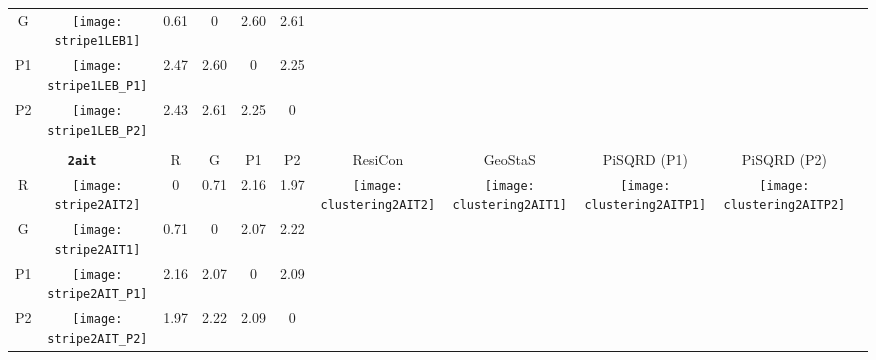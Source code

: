 \documentclass[a4paper,11pt,twoside]{book}%
\begin{document}
\begin{appendices}
\begin{sidewaystable}[h!]
\begin{tabular*}{4cm}{cc|c|c|c|c|c|c|c|c|c|}
\cline{1-6}
\multicolumn{1}{|c|}{G} & \texttt{[image: stripe1LEB1]} & 0.61 & 0 & 2.60 & 2.61 & \multirow{4}{*}{} & \multirow{4}{*}{} & \multirow{4}{*}{} & \multirow{4}{*}{} & \multirow{5}{*}{} \\
\cline{1-6}
\multicolumn{1}{|c|}{P1} & \texttt{[image: stripe1LEB\_P1]} & 2.47 & 2.60 & 0 & 2.25 & \multirow{4}{*}{} & \multirow{4}{*}{} & \multirow{4}{*}{} & \multirow{4}{*}{} & \multirow{5}{*}{}  \\
\cline{1-6}
\multicolumn{1}{|c|}{P2} & \texttt{[image: stripe1LEB\_P2]} & 2.43 & 2.61 & 2.25 & 0 & \multirow{4}{*}{} & \multirow{4}{*}{} & \multirow{4}{*}{} & \multirow{4}{*}{} & \multirow{5}{*}{}  \\
\cline{1-11}
\\
\multicolumn{2}{|c|}{{\bf \texttt{2ait}}} & R & G & P1 & P2 & ResiCon & GeoStaS & PiSQRD (P1) & PiSQRD (P2) & \multirow{5}{*}{\vspace{-0.15cm}\texttt{[image: threeHistogram2AIT]}}  \\
\cline{1-10}
\multicolumn{1}{|c|}{R} & \texttt{[image: stripe2AIT2]} & 0 & 0.71 & 2.16 & 1.97 & \multirow{4}{*}{\vspace{-0.3cm}\texttt{[image: clustering2AIT2]}} & \multirow{4}{*}{\vspace{-0.3cm}\texttt{[image: clustering2AIT1]}} & \multirow{4}{*}{\vspace{-0.3cm}\texttt{[image: clustering2AITP1]}} & \multirow{4}{*}{\vspace{-0.3cm}\texttt{[image: clustering2AITP2]}} &  \multirow{5}{*}{} \\
\cline{1-6}
\multicolumn{1}{|c|}{G} & \texttt{[image: stripe2AIT1]} & 0.71 & 0 & 2.07 & 2.22 & \multirow{4}{*}{} & \multirow{4}{*}{} & \multirow{4}{*}{} & \multirow{4}{*}{} & \multirow{5}{*}{} \\
\cline{1-6}
\multicolumn{1}{|c|}{P1} & \texttt{[image: stripe2AIT\_P1]} & 2.16 & 2.07 & 0 & 2.09 & \multirow{4}{*}{} & \multirow{4}{*}{} & \multirow{4}{*}{} & \multirow{4}{*}{} & \multirow{5}{*}{}  \\
\cline{1-6}
\multicolumn{1}{|c|}{P2} & \texttt{[image: stripe2AIT\_P2]} & 1.97 & 2.22 & 2.09 & 0 & \multirow{4}{*}{} & \multirow{4}{*}{} & \multirow{4}{*}{} & \multirow{4}{*}{} & \multirow{5}{*}{}  \\
\cline{1-11}
\end{tabular*}
\normalfont
\end{sidewaystable}




\end{appendices}
\end{document}

